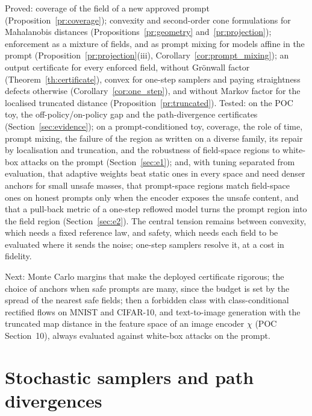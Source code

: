 \documentclass{article}
\theoremstyle{plain}
\theoremstyle{remark}
\begin{document}
Proved: coverage of the field of a new approved prompt (Proposition~\ref{pr:coverage}); convexity and
second-order cone formulations for Mahalanobis distances (Propositions~\ref{pr:geometry} and~\ref{pr:projection});
enforcement as a mixture of fields, and as prompt mixing for models affine in the prompt
(Proposition~\ref{pr:projection}(iii), Corollary~\ref{cor:prompt_mixing}); an output certificate for every enforced field,
without Gr\"onwall factor (Theorem~\ref{th:certificate}), convex for one-step samplers and paying straightness
defects otherwise (Corollary~\ref{cor:one_step}), and without Markov factor for the localised truncated distance
(Proposition~\ref{pr:truncated}). Tested: on the POC toy, the off-policy/on-policy gap and the path-divergence
certificates (Section~\ref{sec:evidence}); on a prompt-conditioned toy, coverage, the role of time, prompt mixing, the
failure of the region as written on a diverse family, its repair by localisation and truncation, and the
robustness of field-space regions to white-box attacks on the prompt (Section~\ref{sec:e1}); and, with tuning separated
from evaluation, that adaptive weights beat static ones in every space and need denser anchors for small unsafe masses,
that prompt-space regions match field-space ones on honest prompts only when the encoder exposes the unsafe content,
and that a pull-back metric of a one-step reflowed model turns the prompt region into the field region
(Section~\ref{sec:e2}). The central tension
remains between convexity, which needs a fixed reference law, and safety, which needs each field to be
evaluated where it sends the noise; one-step samplers resolve it, at a cost in fidelity.

Next: Monte Carlo margins that make the deployed certificate rigorous; the choice of anchors when safe
prompts are many, since the budget is set by the spread of the nearest safe fields; then a forbidden class
with class-conditional rectified flows on MNIST and CIFAR-10, and text-to-image generation with the
truncated map distance in the feature space of an image encoder $\chi$ (POC Section~10), always evaluated
against white-box attacks on the prompt.

\appendix
\section{Stochastic samplers and path divergences}\label{app:sde}
\end{document}
